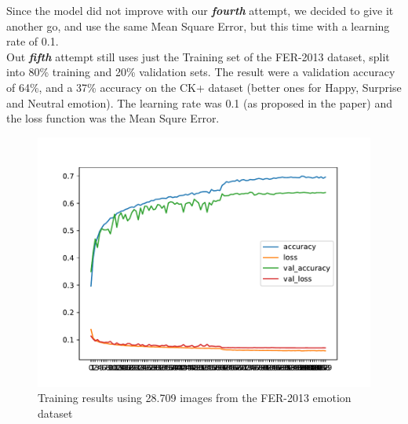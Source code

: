 \documentclass[runningheads,a4paper,11pt]{report}
\begin{document}
\pagebreak

Since the model did not improve with our \textbf{\emph{fourth}} attempt, we decided to give it another go, and use the same Mean Square Error, but this time with a learning rate of 0.1. \\
Out \textbf{\emph{fifth}} attempt still uses just the Training set of the FER-2013 dataset, split into 80\% training and 20\% validation sets. The result were a validation accuracy of 64\%, and a 37\% accuracy on the CK+ dataset (better ones for Happy, Surprise and Neutral emotion). The learning rate was 0.1 (as proposed in the paper) and the loss function was the Mean Squre Error.
\begin{figure}[htbp]
\begin{center}
	\includegraphics[scale=0.8]{Fig/fer_training_28k_01_mean_square.pdf}
	\caption{Training results using 28.709 images from the FER-2013 emotion dataset}
	\label{fer_training_28k_01_mean_square}
\end{center}
\end{figure}
\end{document}
